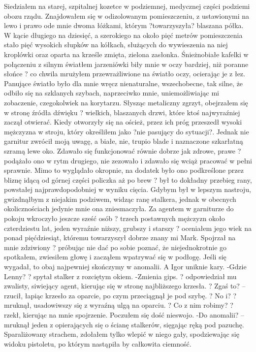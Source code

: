 \documentclass[../MAIN.tex]{subfiles}
\begin{document}
Siedziałem na starej, szpitalnej kozetce w podziemnej, medycznej części podziemi obozu rządu. Znajdowałem się w odizolowanym pomieszczeniu, z ustawionymi na lewo i prawo ode mnie dwoma łóżkami, którym ?towarzyszyła? blaszana półka. W kącie długiego na dziesięć, a szerokiego na około pięć metrów pomieszczenia stało pięć wysokich słupków na kółkach, służących do wywieszenia na niej kroplówki oraz oparta na krześle zmięta, zielona zasłonka.
Śnieżnobiałe kafelki w połączeniu z silnym światłem jarzeniówki biły mnie w oczy bardziej, niż poranne słońce ? co chwila mrużyłem przewrażliwione na światło oczy, ocierając je z łez. Panujące światło było dla mnie wręcz nienaturalne, wszechobecne, tak silne, że odbiło się na szklanych szybach, naprzeciwko mnie, uniemożliwiając mi zobaczenie, czegokolwiek na korytarzu.
Słysząc metaliczny zgrzyt, obejrzałem się w stronę źródła dźwięku ? wielkich, blaszanych drzwi, które ktoś najwyraźniej zaczął otwierać.
Kiedy otworzyły się na oścież, przez ich próg przeszedł wysoki mężczyzna w stroju, który określiłem jako ?nie pasujący do sytuacji?. Jednak nie garnitur zwrócił moją uwagę, a białe, nie, trupio blade i naznaczone szkarłatną szramą lewe oko. Zdawało się funkcjonować równie dobrze jak zdrowe, prawe ? podążało ono w rytm drugiego, nie zezowało i zdawało się wciąż pracować w pełni sprawnie. Mimo to wyglądało okropnie, na dodatek było ono podkreślone przez bliznę idącą od górnej części policzka aż po brew ? był to dokładny przebieg rany, powstałej najprawdopodobniej w wyniku cięcia.
Gdybym był w lepszym nastroju, gwizdnąłbym z niejakim podziwem, widząc ranę stalkera, jednak w obecnych okolicznościach jedynie mnie ona zniesmaczyła.
Za agentem w garniturze do pokoju wkroczyło jeszcze sześć osób ? trzech postawnych mężczyzn około czterdziestu lat, jeden wyraźnie niższy, grubszy i starszy ? oceniałem jego wiek na ponad pięćdziesiąt, któremu towarzyszył dobrze znany mi Mark.
Spojrzał na mnie zdziwiony ? próbując nie dać po sobie poznać, że niejednokrotnie go spotkałem, zwiesiłem głowę i zacząłem wpatrywać się w podłogę.
Jeśli się wygadał, to obaj najpewniej skończymy w anomalii.
A Igor uniknie kary.
-Gdzie Lenny? ? spytał stalker z rozciętym okiem.
-Zmienia gips. ? odpowiedział mu zwalisty, siwiejący agent, kierując się w stronę najbliższego krzesła. ? Zgaś to? -- rzucił, łapiąc krzesło za oparcie, po czym przeciągnął je pod szybę. ? No i? ? mruknął, usadowiwszy się z wyraźną ulgą na oparciu. ? Co z nim robimy? ? rzekł, kierując na mnie spojrzenie.
Poczułem się dość nieswojo.
-Do anomalii? -- mruknął jeden z opierających się o ścianę stalkerów, sięgając ręką pod pazuchę. Sparaliżowany strachem, zdołałem tylko wlepić w niego gały, spodziewając się widoku pistoletu, po którym nastąpiła by całkowita ciemność.
\end{document}
